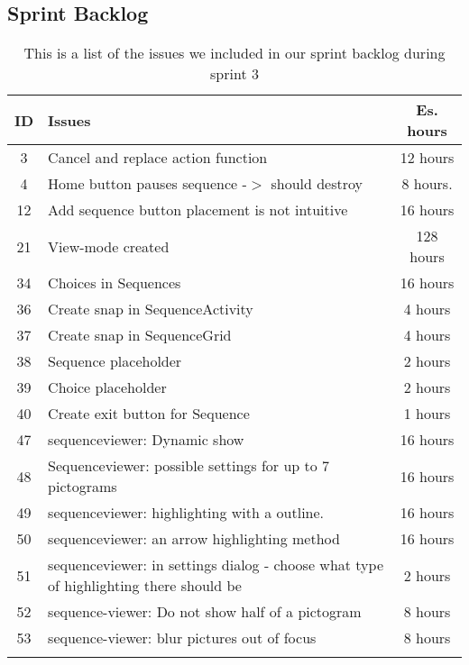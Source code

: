 \subsection{Sprint Backlog}\label{subsec:spr3_sprblog}
\begin{longtable} { | c | p{12cm} | c | } 
\hline
	ID 	&	Issues	&	Es. hours  \\\hline
	3	& 	Cancel and replace action function	&	12 hours \\\hline
	4	&	Home button pauses sequence -$>$ should destroy	&	8 hours.	\\\hline
	12	& 	Add sequence button placement is not intuitive	&	16 hours 	\\\hline
	21	& 	View-mode created				&	128 hours	\\\hline
	34	&	Choices in Sequences				& 	16 hours  \\\hline
	36	& 	Create snap in SequenceActivity		&	4 hours  \\\hline
	37	&	Create snap in SequenceGrid		& 	4 hours \\\hline
	38	& 	Sequence placeholder 			&	2 hours\\\hline
	39	&	Choice placeholder		 		&	2 hours \\\hline
	40	&	Create exit button for Sequence	&	1 hours \\\hline
	47	&	sequenceviewer: Dynamic show	 	&	16 hours \\\hline
	48	&	Sequenceviewer: possible settings for up to 7 pictograms	 & 	16 hours	\\\hline
	49	&	sequenceviewer: highlighting with a outline.	  &	16 hours \\\hline
	50	&	sequenceviewer: an arrow highlighting method	 &	16 hours \\\hline
	51	&	sequenceviewer: in settings dialog - choose what type of highlighting there should be	 &	2 hours \\\hline
	52	&	sequence-viewer: Do not show half of a pictogram	&	8 hours	\\\hline
	53	&	sequence-viewer: blur pictures out of focus		 &	8 hours \\\hline
\caption{This is a list of the issues we included in our sprint backlog during sprint 3}
\label{tab:spr3_sprintblog}
\end{longtable}
